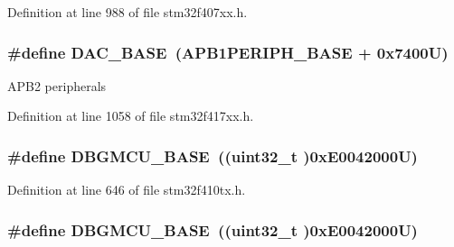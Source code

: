 Definition at line 988 of file stm32f407xx.\+h.

\subsubsection[{\texorpdfstring{D\+A\+C\+\_\+\+B\+A\+SE}{DAC_BASE}}]{\setlength{\rightskip}{0pt plus 5cm}\#define D\+A\+C\+\_\+\+B\+A\+SE~({\bf A\+P\+B1\+P\+E\+R\+I\+P\+H\+\_\+\+B\+A\+SE} + 0x7400\+U)}\hypertarget{group___peripheral__registers__structures_gad18d0b914c7f68cecbee1a2d23a67d38}{}\label{group___peripheral__registers__structures_gad18d0b914c7f68cecbee1a2d23a67d38}
A\+P\+B2 peripherals 

Definition at line 1058 of file stm32f417xx.\+h.

\subsubsection[{\texorpdfstring{D\+B\+G\+M\+C\+U\+\_\+\+B\+A\+SE}{DBGMCU_BASE}}]{\setlength{\rightskip}{0pt plus 5cm}\#define D\+B\+G\+M\+C\+U\+\_\+\+B\+A\+SE~((uint32\+\_\+t )0x\+E0042000\+U)}\hypertarget{group___peripheral__registers__structures_ga4adaf4fd82ccc3a538f1f27a70cdbbef}{}\label{group___peripheral__registers__structures_ga4adaf4fd82ccc3a538f1f27a70cdbbef}


Definition at line 646 of file stm32f410tx.\+h.

\subsubsection[{\texorpdfstring{D\+B\+G\+M\+C\+U\+\_\+\+B\+A\+SE}{DBGMCU_BASE}}]{\setlength{\rightskip}{0pt plus 5cm}\#define D\+B\+G\+M\+C\+U\+\_\+\+B\+A\+SE~((uint32\+\_\+t )0x\+E0042000\+U)}\hypertarget{group___peripheral__registers__structures_ga4adaf4fd82ccc3a538f1f27a70cdbbef}{}\label{group___peripheral__registers__structures_ga4adaf4fd82ccc3a538f1f27a70cdbbef}


